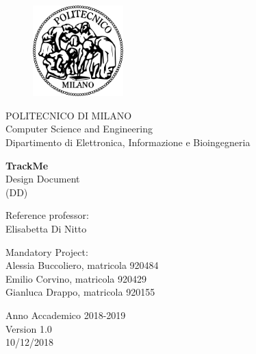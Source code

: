 \thispagestyle{empty}

\vspace*{-2.5cm} 
\bfseries{
    \begin{center}
    
    \begin{figure}[htbp]
        \begin{center}
          \includegraphics[width=3.5cm]{./pictures/logopm}
        \end{center}
      \end{figure}
    
      \large
      POLITECNICO DI MILANO\\
      \normalsize
      Computer Science and Engineering \\
      Dipartimento di Elettronica, Informazione e Bioingegneria\\
      
      \vspace*{3.3cm} \LARGE
    
      \textbf{TrackMe}\\
      
      \vspace*{.75truecm} \large
        Design Document \\
        (DD)
    \end{center}

    \vspace*{2.0cm} \large
    \begin{flushleft}
    
      Reference professor: \\
      Elisabetta Di Nitto
    
    \end{flushleft}
    
    \vspace*{1.0cm}
    \begin{flushright}
    
    Mandatory Project:\\
    Alessia Buccoliero, matricola 920484\\
    Emilio Corvino, matricola 920429\\
    Gianluca Drappo, matricola 920155
    
    \end{flushright}
    
    \vspace*{0.5cm}
    \begin{center}
    
      Anno Accademico 2018-2019 \\
      
      \vspace*{0.6cm}
      Version 1.0 \\
      10/12/2018 \\
    \end{center} \clearpage
}